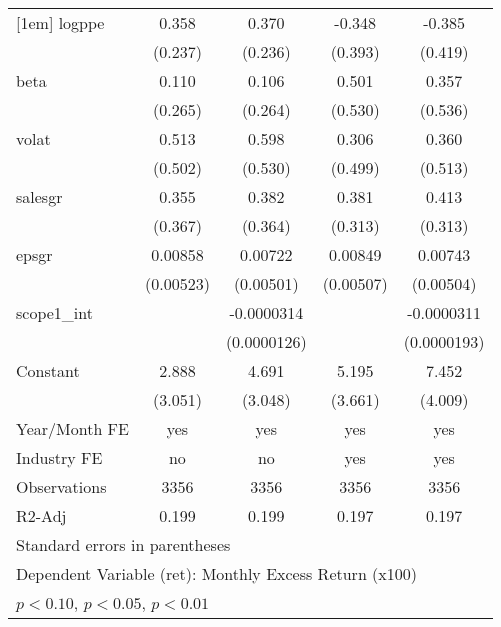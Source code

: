 \begin{table}[htbp]
\begin{tabular}{l*{4}{c}}
[1em]
logppe              &       0.358         &       0.370         &      -0.348         &      -0.385         \\
                    &     (0.237)         &     (0.236)         &     (0.393)         &     (0.419)         \\
[1em]
beta                &       0.110         &       0.106         &       0.501         &       0.357         \\
                    &     (0.265)         &     (0.264)         &     (0.530)         &     (0.536)         \\
[1em]
volat               &       0.513         &       0.598         &       0.306         &       0.360         \\
                    &     (0.502)         &     (0.530)         &     (0.499)         &     (0.513)         \\
[1em]
salesgr             &       0.355         &       0.382         &       0.381         &       0.413         \\
                    &     (0.367)         &     (0.364)         &     (0.313)         &     (0.313)         \\
[1em]
epsgr               &     0.00858         &     0.00722         &     0.00849\sym{*}  &     0.00743         \\
                    &   (0.00523)         &   (0.00501)         &   (0.00507)         &   (0.00504)         \\
[1em]
scope1\_int          &                     &  -0.0000314\sym{**} &                     &  -0.0000311         \\
                    &                     & (0.0000126)         &                     & (0.0000193)         \\
[1em]
Constant            &       2.888         &       4.691         &       5.195         &       7.452\sym{*}  \\
                    &     (3.051)         &     (3.048)         &     (3.661)         &     (4.009)         \\
\hline
Year/Month FE       &         yes         &         yes         &         yes         &         yes         \\
Industry FE         &          no         &          no         &         yes         &         yes         \\
Observations        &        3356         &        3356         &        3356         &        3356         \\
R2-Adj              &       0.199         &       0.199         &       0.197         &       0.197         \\
\hline\hline
\multicolumn{5}{l}{\footnotesize Standard errors in parentheses}\\
\multicolumn{5}{l}{\footnotesize Dependent Variable (ret): Monthly Excess Return (x100)}\\
\multicolumn{5}{l}{\footnotesize \sym{*} \(p<0.10\), \sym{**} \(p<0.05\), \sym{***} \(p<0.01\)}\\
\end{tabular}
\end{table}
